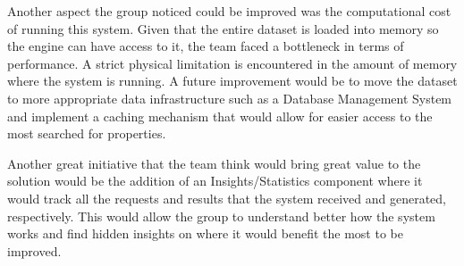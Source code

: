 \documentclass[runningheads]{llncs}
\begin{document}
Another aspect the group noticed could be improved was the computational cost of running this system. Given that the entire dataset is loaded into memory so the engine can have access to it, the team faced a bottleneck in terms of performance. A strict physical limitation is encountered in the amount of memory where the system is running. A future improvement would be to move the dataset to more appropriate data infrastructure such as a Database Management System and implement a caching mechanism that would allow for easier access to the most searched for properties.

Another great initiative that the team think would bring great value to the solution would be the addition of an Insights/Statistics component where it would track all the requests and results that the system received and generated, respectively. This would allow the group to understand better how the system works and find hidden insights on where it would benefit the most to be improved.




\end{document}
